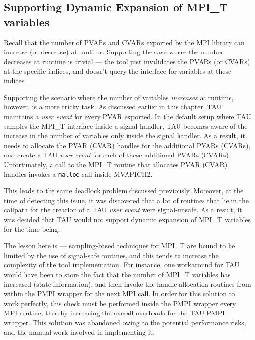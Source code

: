 \subsection {Supporting Dynamic Expansion of MPI\_T variables}
Recall that the number of PVARs and CVARs exported by the MPI library can increase (or decrease) at runtime. Supporting the case where the number decreases at runtime is trivial --- the tool just invalidates the PVARs (or CVARs) at the specific indices, and doesn't query the interface for variables at these indices.
\par Supporting the scenario where the number of variables \textit{increases} at runtime, however, is a more tricky task. As discussed earlier in this chapter, TAU maintains a \textit{user event} for every PVAR exported. In the default setup where TAU samples the MPI\_T interface inside a signal handler, TAU becomes aware of the increase in the number of variables only inside the signal handler. As a result, it needs to allocate the PVAR (CVAR) handles for the additional PVARs (CVARs), and create a TAU \textit{user event} for each of these additional PVARs (CVARs). Unfortunately, a call to the MPI\_T routine that allocates PVAR (CVAR) handles invokes a \verb+malloc+ call inside MVAPICH2. 
\par This leads to the same deadlock problem discussed previously. Moreover, at the time of detecting this issue, it was discovered that a lot of routines that lie in the callpath for the creation of a TAU \textit{user event} were signal-unsafe. As a result, it was decided that TAU would not support dynamic expansion of MPI\_T variables for the time being. 
\par The lesson here is --- sampling-based techniques for MPI\_T are bound to be limited by the use of signal-safe routines, and this tends to increase the complexity of the tool implementation. For instance, one workaround for TAU would have been to store the fact that the number of MPI\_T variables has increased (state information), and then invoke the handle allocation routines from within the PMPI wrapper for the next MPI call. In order for this solution to work perfectly, this check must be performed inside the PMPI wrapper every MPI routine, thereby increasing the overall overheads for the TAU PMPI wrapper. This solution was abandoned owing to the potential performance risks, and the manual work involved in implementing it.
